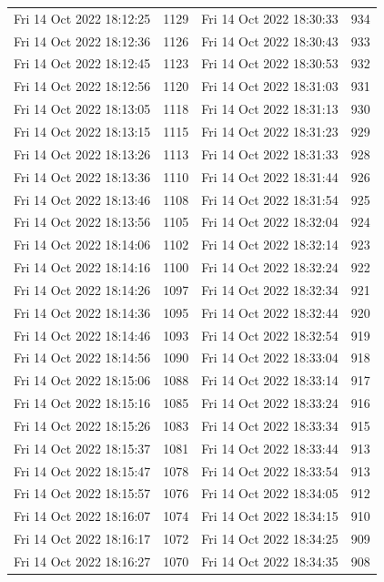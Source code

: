 \documentclass[12pt]{ctexart}
\numberwithin{equation}{section}
\begin{document}
\begin{longtable}{cc|cc}
Fri 14 Oct 2022 18:12:25 & 1129 & Fri 14 Oct 2022 18:30:33 & 934 \\
Fri 14 Oct 2022 18:12:36 & 1126 & Fri 14 Oct 2022 18:30:43 & 933 \\
Fri 14 Oct 2022 18:12:45 & 1123 & Fri 14 Oct 2022 18:30:53 & 932 \\
Fri 14 Oct 2022 18:12:56 & 1120 & Fri 14 Oct 2022 18:31:03 & 931 \\
Fri 14 Oct 2022 18:13:05 & 1118 & Fri 14 Oct 2022 18:31:13 & 930 \\
Fri 14 Oct 2022 18:13:15 & 1115 & Fri 14 Oct 2022 18:31:23 & 929 \\
Fri 14 Oct 2022 18:13:26 & 1113 & Fri 14 Oct 2022 18:31:33 & 928 \\
Fri 14 Oct 2022 18:13:36 & 1110 & Fri 14 Oct 2022 18:31:44 & 926 \\
Fri 14 Oct 2022 18:13:46 & 1108 & Fri 14 Oct 2022 18:31:54 & 925 \\
Fri 14 Oct 2022 18:13:56 & 1105 & Fri 14 Oct 2022 18:32:04 & 924 \\
Fri 14 Oct 2022 18:14:06 & 1102 & Fri 14 Oct 2022 18:32:14 & 923 \\
Fri 14 Oct 2022 18:14:16 & 1100 & Fri 14 Oct 2022 18:32:24 & 922 \\
Fri 14 Oct 2022 18:14:26 & 1097 & Fri 14 Oct 2022 18:32:34 & 921 \\
Fri 14 Oct 2022 18:14:36 & 1095 & Fri 14 Oct 2022 18:32:44 & 920 \\
Fri 14 Oct 2022 18:14:46 & 1093 & Fri 14 Oct 2022 18:32:54 & 919 \\
Fri 14 Oct 2022 18:14:56 & 1090 & Fri 14 Oct 2022 18:33:04 & 918 \\
Fri 14 Oct 2022 18:15:06 & 1088 & Fri 14 Oct 2022 18:33:14 & 917 \\
Fri 14 Oct 2022 18:15:16 & 1085 & Fri 14 Oct 2022 18:33:24 & 916 \\
Fri 14 Oct 2022 18:15:26 & 1083 & Fri 14 Oct 2022 18:33:34 & 915 \\
Fri 14 Oct 2022 18:15:37 & 1081 & Fri 14 Oct 2022 18:33:44 & 913 \\
Fri 14 Oct 2022 18:15:47 & 1078 & Fri 14 Oct 2022 18:33:54 & 913 \\
Fri 14 Oct 2022 18:15:57 & 1076 & Fri 14 Oct 2022 18:34:05 & 912 \\
Fri 14 Oct 2022 18:16:07 & 1074 & Fri 14 Oct 2022 18:34:15 & 910 \\
Fri 14 Oct 2022 18:16:17 & 1072 & Fri 14 Oct 2022 18:34:25 & 909 \\
Fri 14 Oct 2022 18:16:27 & 1070 & Fri 14 Oct 2022 18:34:35 & 908 \\

\end{longtable}
\end{document}
